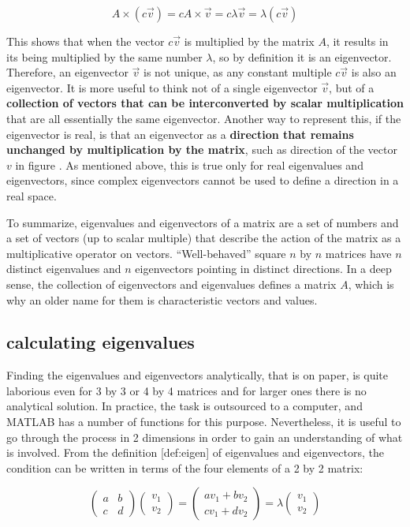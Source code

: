 \documentclass[
  letterpaper,
  DIV=11,
  numbers=noendperiod]{scrreprt}
\begin{document}
\[
A  \times  (c \vec v) = c A  \times  \vec v = c \lambda \vec v =  \lambda (c \vec v)
\]

This shows that when the vector \(c \vec v\) is multiplied by the matrix
\(A\), it results in its being multiplied by the same number
\(\lambda\), so by definition it is an eigenvector. Therefore, an
eigenvector \(\vec v\) is not unique, as any constant multiple
\(c \vec v\) is also an eigenvector. It is more useful to think not of a
single eigenvector \(\vec v\), but of a \textbf{collection of vectors
that can be interconverted by scalar multiplication} that are all
essentially the same eigenvector. Another way to represent this, if the
eigenvector is real, is that an eigenvector as a \textbf{direction that
remains unchanged by multiplication by the matrix}, such as direction of
the vector \(v\) in figure . As mentioned above, this is true only for
real eigenvalues and eigenvectors, since complex eigenvectors cannot be
used to define a direction in a real space.

To summarize, eigenvalues and eigenvectors of a matrix are a set of
numbers and a set of vectors (up to scalar multiple) that describe the
action of the matrix as a multiplicative operator on vectors.
``Well-behaved'' square \(n\) by \(n\) matrices have \(n\) distinct
eigenvalues and \(n\) eigenvectors pointing in distinct directions. In a
deep sense, the collection of eigenvectors and eigenvalues defines a
matrix \(A\), which is why an older name for them is characteristic
vectors and values.

\hypertarget{calculating-eigenvalues}{%
\subsection{calculating eigenvalues}\label{calculating-eigenvalues}}

Finding the eigenvalues and eigenvectors analytically, that is on paper,
is quite laborious even for 3 by 3 or 4 by 4 matrices and for larger
ones there is no analytical solution. In practice, the task is
outsourced to a computer, and MATLAB has a number of functions for this
purpose. Nevertheless, it is useful to go through the process in 2
dimensions in order to gain an understanding of what is involved. From
the definition {[}def:eigen{]} of eigenvalues and eigenvectors, the
condition can be written in terms of the four elements of a 2 by 2
matrix:

\[
\left(\begin{array}{cc}a & b \\c & d\end{array}\right)\left(\begin{array}{c}v_1 \\ v_2 \end{array}\right) = \left(\begin{array}{c}av_1 +b v_2\\ cv_1+ dv_2 \end{array}\right) = \lambda \left(\begin{array}{c}v_1 \\ v_2 \end{array}\right)
\]
\end{document}
